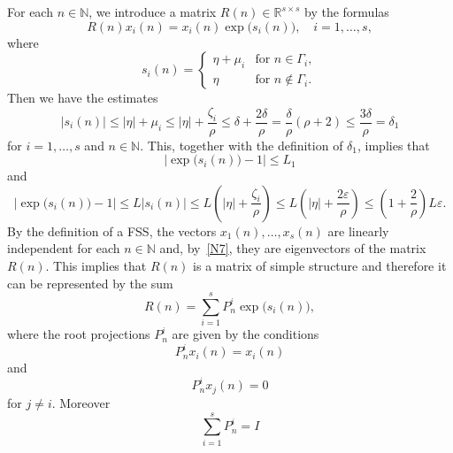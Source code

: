 \documentclass[11pt]{article}
\begin{document}
For each $n\in \mathbb{N}$, we introduce a matrix $R(n)\in \mathbb{R}%
^{s\times s}$ by the formulas%
\begin{equation}
R(n)x_{i}( n) =x_{i}( n) \exp \bigl(s_{i}(
n) \bigr),\quad i=1,\dots ,s,  
\label{N7}
\end{equation}%
where 
\begin{equation*}
s_{i}( n) =
\begin{cases}
\eta +\mu _{i} & \textrm{for\ } n\in \Gamma _{i},\\
\eta & \textrm{for\ } n\not\in \Gamma _{i}.
\end{cases}
\end{equation*}%
Then we have the estimates%
\begin{equation*}
|s_{i}(n)|\le|\eta|+\mu_{i}\le|\eta| +\frac{\zeta_{i}}{\rho}\le
\delta+\frac{2\delta}{\rho}=\frac{\delta}{\rho}(\rho+2)\le\frac{3\delta}{\rho}=
\delta_{1}
\end{equation*}%
for $i=1,\dots ,s$ and $n\in \mathbb{N}$. This, together with the definition
of $\delta_{1}$, implies that 
\begin{equation*}
\bigl|\exp\bigl(s_{i}(n)\bigr)-1\bigr| \le L_{1}
\end{equation*}%
and 
\begin{equation*}
\bigl|\exp\bigl(s_{i}(n)\bigr)-1\bigr|\le
L\bigl| s_{i}( n) \bigr| \le 
L\left(|\eta|+\frac{\zeta_i}{\rho}\right)\le
L\left(|\eta|+\frac{2\varepsilon}{\rho}\right)\le
\left( 1+\frac{2}{\rho }%
\right) L\varepsilon.
\end{equation*}%
By the definition of 
a FSS, the vectors $x_{1}(n),\dots,x_{s}(n)$ are linearly independent for each $n\in \mathbb{N}$
and, by~\eqref{N7}, they are eigenvectors of the matrix $R(n)$. This implies
that $R(n)$ is a matrix of simple structure \cite[p.\,239, Proposition 2]{Lancaster} 
and therefore it can be represented by the sum%
\begin{equation*}
R(n)=\sum\limits_{i=1}^{s}P_{n}^{i}\exp\bigl(s_{i}(n)\bigr),
\end{equation*}%
where the root projections $P_{n}^{i}$ are given by the conditions%
\begin{equation*}
P_{n}^{i}x_{i}( n) =x_{i}( n)
\end{equation*}%
and%
\begin{equation*}
P_{n}^{i}x_{j}( n) =0
\end{equation*}%
for $j\neq i$. Moreover 
\begin{equation*}
\sum\limits_{i=1}^{s}P_{n}^{i}=I
\end{equation*}%
\end{document}
